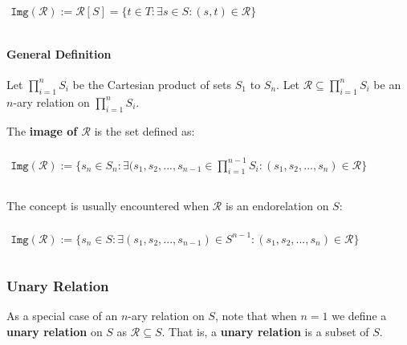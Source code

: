 \begin{math}
  \begin{array}{c}
    \\
    \mathtt{Img}(\mathcal{R}) := \mathcal{R}[S] = \{ t \in T: \exists s \in S: (s, t) \in \mathcal{R} \}\\
    \\
  \end{array}
\end{math}

\paragraph{General Definition}

Let $\displaystyle \prod_{i=1}^n S_i$ be the Cartesian product of sets
$S_1$ to $S_n$. Let
$\mathcal{R} \subseteq \displaystyle \prod_{i=1}^n S_i$ be an $n$-ary
relation on $\displaystyle \prod_{i=1}^n S_i$.

The \textbf{image of $\mathcal{R}$} is the set defined as:

\begin{math}
  \begin{array}{c}
    \\
    \mathtt{Img}(\mathcal{R}) := \{ s_n \in S_n: \exists (s_1, s_2, ..., s_{n-1} \in \displaystyle \prod_{i=1}^{n-1} S_i: (s_1, s_2, ..., s_n) \in \mathcal{R} \}\\
    \\
  \end{array}
\end{math}

The concept is usually encountered when $\mathcal{R}$ is an
endorelation on $S$:

\begin{math}
  \begin{array}{c}
    \\
    \mathtt{Img}(\mathcal{R}) := \{ s_n \in S: \exists (s_1, s_2, ..., s_{n-1}) \in S^{n-1}: (s_1, s_2, ..., s_n) \in \mathcal{R} \}\\
    \\
  \end{array}
\end{math}


\subsubsection{Unary Relation}
As a special case of an $n$-ary relation on $S$, note that when $n=1$
we define a \textbf{unary relation} on $S$ as
$\mathcal{R} \subseteq S$. That is, a \textbf{unary relation} is a
subset of $S$.

